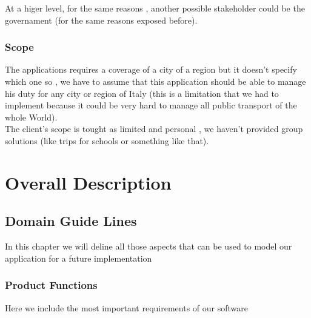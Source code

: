 \documentclass[a4paper]{book}
\begin{document}
At a higer level, for the same reasons , another possible stakeholder could be the governament (for the same reasons exposed before).

\section{Scope}

The applications requires a coverage of a city of a region but it doesn't specify which one so , we have to assume that this application should be able to manage his duty for any city or region of Italy (this is a limitation that we had to implement because it could be very hard to manage all public transport of the whole World).\\

The client's scope is tought as limited and personal , we haven't provided group solutions (like trips for schools or something like that).

\part{Overall Description}

\chapter{Domain Guide Lines}
In this chapter we will deline all those aspects that can be used to model our application for a future implementation

\section{Product Functions}
Here we include the most important requirements of our software
\end{document}
